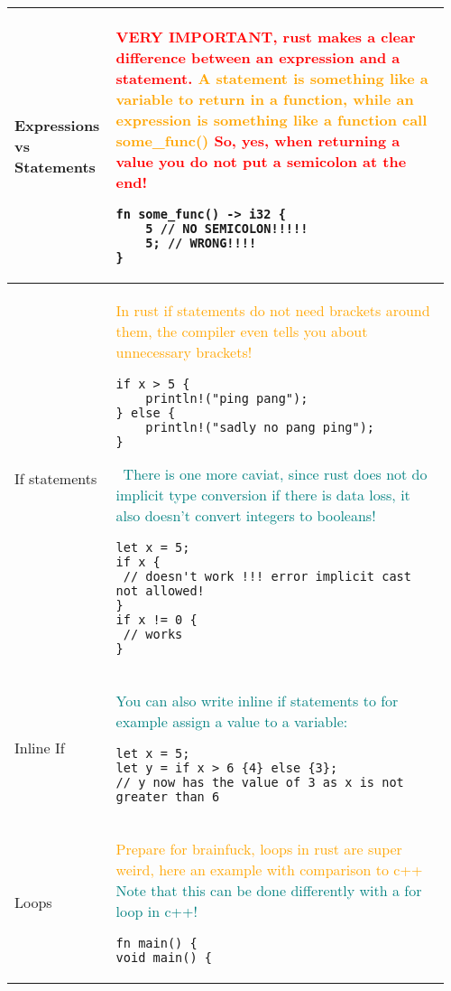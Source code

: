 \documentclass[main.tex,fontsize=8pt,paper=a4,paper=portrait,DIV=calc,]{scrartcl}
\begin{document}
\begin{table}[ht!]
\begin{tabular}{|m{0.2\linewidth}|m{0.755\linewidth}|}
\hline
Expressions vs Statements &
\textcolor{red}{\textbf{VERY IMPORTANT, rust makes a clear difference between an expression and a statement.}}\newline
\textcolor{orange}{A statement is something like a variable to return in a function, while an expression is something like a function call some\_func()}\newline
\textcolor{red}{\textbf{So, yes, when returning a value you do not put a semicolon at the end!}}\newline
\begin{lstlisting}
fn some_func() -> i32 {
    5 // NO SEMICOLON!!!!!
    5; // WRONG!!!!
}
\end{lstlisting}\\
\hline
If statements & 
\textcolor{orange}{In rust if statements do not need brackets around them, the compiler even tells you about unnecessary brackets!}\newline
\begin{lstlisting}
if x > 5 {
    println!("ping pang");
} else {
    println!("sadly no pang ping");
}
\end{lstlisting}
\, \newline
\textcolor{teal}{There is one more caviat, since rust does not do implicit type conversion if there is data loss, it also doesn't convert integers to booleans!}
\begin{lstlisting}
let x = 5;
if x {
 // doesn't work !!! error implicit cast not allowed!
}
if x != 0 {
 // works
}
\end{lstlisting}\\
\hline
Inline If & 
\textcolor{teal}{You can also write inline if statements to for example assign a value to a variable:}\newline
\begin{lstlisting}
let x = 5;
let y = if x > 6 {4} else {3};
// y now has the value of 3 as x is not greater than 6
\end{lstlisting}\\
\hline
Loops & 
\textcolor{orange}{Prepare for brainfuck, loops in rust are super weird, here an example with comparison to c++}\newline
\textcolor{teal}{Note that this can be done differently with a for loop in c++!}\newline
\begin{lstlisting}
fn main() {                                    void main() {        

\end{lstlisting}
\end{tabular}
\end{table}
\end{document}
